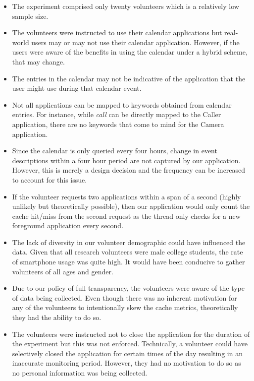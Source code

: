 \documentclass[12pt]{uthesis-v12}  %
\begin{document}
	\begin{itemize}
		\item The experiment comprised only twenty volunteers which is a relatively low sample size.
		\item The volunteers were instructed to use their calendar applications but real-world users may or may not use their calendar application. However, if the users were aware of the benefits in using the calendar under a hybrid scheme, that may change.
		\item The entries in the calendar may not be indicative of the application that the user might use during that calendar event. 
		\item Not all applications can be mapped to keywords obtained from calendar entries. For instance, while {\em call} can be directly mapped to the Caller application, there are no keywords that come to mind for the Camera application.
		\item Since the calendar is only queried every four hours, change in event descriptions within a four hour period are not captured by our application. However, this is merely a design decision and the frequency can be increased to account for this issue. 
		\item If the volunteer requests two applications within a span of a second (highly unlikely but theoretically possible), then our application would only count the cache hit/miss from the second request as the thread only checks for a new foreground application every second.
		\item The lack of diversity in our volunteer demographic could have influenced the data. Given that all research volunteers were male college students, the rate of smartphone usage was quite high. It would have been conducive to gather volunteers of all ages and gender.
		\item Due to our policy of full transparency, the volunteers were aware of the type of data being collected. Even though there was no inherent motivation for any of the volunteers to intentionally skew the cache metrics, theoretically they had the ability to do so. 
		\item The volunteers were instructed not to close the application for the duration of the experiment but this was not enforced. Technically, a volunteer could have selectively closed the application for certain times of the day resulting in an inaccurate monitoring period. However, they had no motivation to do so as no personal information was being collected.
	\end{itemize}  		
\end{document}
